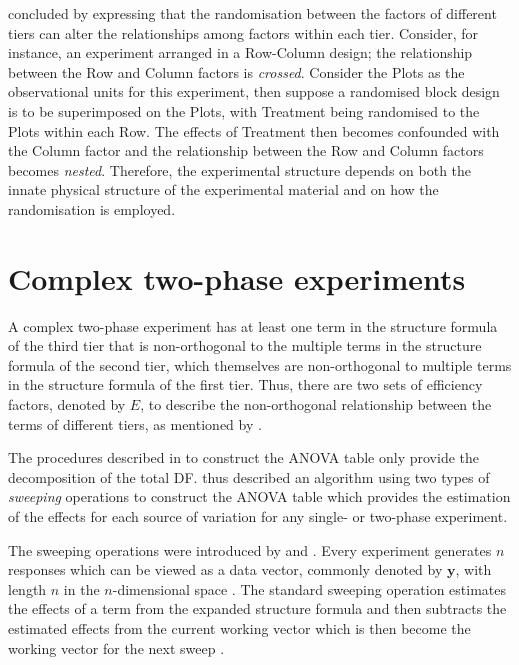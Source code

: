 \documentclass[11pt,a4paper]{article}
\begin{document}
\cite{Brien1983} concluded by expressing that the randomisation between the factors of different tiers can alter the relationships among factors within each tier. Consider, for instance, an experiment arranged in a Row-Column design; the relationship between the Row and Column factors is \emph{crossed}. Consider the Plots as the observational units for this experiment, then suppose a randomised block design is to be superimposed on the Plots, with Treatment being randomised to the Plots within each Row. The effects of Treatment then becomes confounded with the Column factor and the relationship between the Row and Column factors becomes \emph{nested}. Therefore, the experimental structure depends on both the innate physical structure of the experimental material and on how the randomisation is employed. 

\section{Complex two-phase experiments}\label{sec:Brien1999}
A complex two-phase experiment has at least one term in the structure formula of the third tier that is non-orthogonal to the multiple terms in the structure formula of the second tier, which themselves are non-orthogonal to multiple terms in the structure formula of the first tier. Thus, there are two sets of efficiency factors, denoted by $E$, to describe the non-orthogonal relationship between the terms of different tiers, as mentioned by \cite{Wood1988}. 

The procedures described in \cite{Brien1983} to construct the ANOVA table only provide the decomposition of the total DF. \cite{Brien1999} thus described an algorithm using two types of \emph{sweeping} operations to construct the ANOVA table which provides the estimation of the effects for each source of variation for any single- or two-phase experiment. 

The sweeping operations were introduced by \cite{Wilkinson1970} and \cite{Payne1977}. Every experiment generates $n$ responses which can be viewed as a data vector, commonly denoted by $\bm{y}$, with length $n$ in the $n$-dimensional space \citep{Payne1977}. The standard sweeping operation estimates the effects of a term from the expanded structure formula and then subtracts the estimated effects from the current working vector which is then become the working vector for the next sweep \citep{Brien1999}. 
\end{document}
